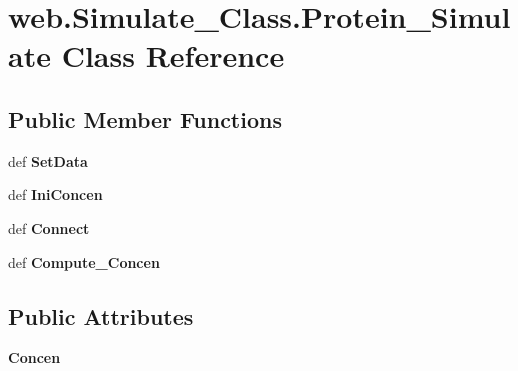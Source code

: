 \hypertarget{classweb_1_1_simulate___class_1_1_protein___simulate}{\section{web.\-Simulate\-\_\-\-Class.\-Protein\-\_\-\-Simulate Class Reference}
\label{classweb_1_1_simulate___class_1_1_protein___simulate}
}
\subsection*{Public Member Functions}
\begin{DoxyCompactItemize}
\item 
\hypertarget{classweb_1_1_simulate___class_1_1_protein___simulate_aed90abad02aad5dc6ac31a344032b8c8}{def {\bfseries Set\-Data}}\label{classweb_1_1_simulate___class_1_1_protein___simulate_aed90abad02aad5dc6ac31a344032b8c8}

\item 
\hypertarget{classweb_1_1_simulate___class_1_1_protein___simulate_a25ef40b09e3b2ad608d7fd32dfbbc552}{def {\bfseries Ini\-Concen}}\label{classweb_1_1_simulate___class_1_1_protein___simulate_a25ef40b09e3b2ad608d7fd32dfbbc552}

\item 
\hypertarget{classweb_1_1_simulate___class_1_1_protein___simulate_ad8e95c5ff42680746fd7f0e66dfefa95}{def {\bfseries Connect}}\label{classweb_1_1_simulate___class_1_1_protein___simulate_ad8e95c5ff42680746fd7f0e66dfefa95}

\item 
\hypertarget{classweb_1_1_simulate___class_1_1_protein___simulate_ac7de7384d587c3bc575e762ad40d8446}{def {\bfseries Compute\-\_\-\-Concen}}\label{classweb_1_1_simulate___class_1_1_protein___simulate_ac7de7384d587c3bc575e762ad40d8446}

\end{DoxyCompactItemize}
\subsection*{Public Attributes}
\begin{DoxyCompactItemize}
\item 
\hypertarget{classweb_1_1_simulate___class_1_1_protein___simulate_ac37e685db664715fb1f7a71d9064d80d}{{\bfseries Concen}}\label{classweb_1_1_simulate___class_1_1_protein___simulate_ac37e685db664715fb1f7a71d9064d80d}

\end{DoxyCompactItemize}
